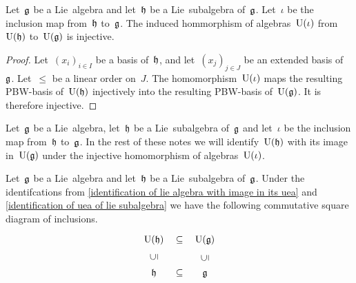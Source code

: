 

\begin{proposition}
	\label{inclusion of universal enveloping algebras}
	Let~$\mathfrak{g}$ be a Lie~algebra and let~$\mathfrak{h}$ be a Lie~subalgebra of~$\mathfrak{g}$.
	Let~$\iota$ be the inclusion map from~$\mathfrak{h}$ to~$\mathfrak{g}$.
	The induced hommorphism of algebras~$\operatorname{U}(\iota)$ from~$\operatorname{U}(\mathfrak{h})$ to~$\operatorname{U}(\mathfrak{g})$ is injective.
\end{proposition}


\begin{proof}
	Let~$(x_i)_{i \in I}$ be a basis of~$\mathfrak{h}$, and let~$(x_j)_{j \in J}$ be an extended basis of~$\mathfrak{g}$.
	Let~$\leq$ be a linear order on~$J$.
	The homomorphism~$\operatorname{U}(\iota)$ maps the resulting PBW-basis of~$\operatorname{U}(\mathfrak{h})$ injectively into the resulting PBW-basis of~$\operatorname{U}(\mathfrak{g})$.
	It is therefore injective.
\end{proof}


\begin{convention}
	\label{identification of uea of lie subalgebra}
	Let~$\mathfrak{g}$ be a Lie~algebra, let~$\mathfrak{h}$ be a Lie~subalgebra of~$\mathfrak{g}$ and let~$\iota$ be the inclusion map from~$\mathfrak{h}$ to~$\mathfrak{g}$.
	In the rest of these notes we will identify~$\operatorname{U}(\mathfrak{h})$ with its image in~$\operatorname{U}(\mathfrak{g})$ under the injective homomorphism of algebras~$\operatorname{U}(\iota)$.
\end{convention}


\begin{remark}
	Let~$\mathfrak{g}$ be a Lie~algebra and let~$\mathfrak{h}$ be a Lie~subalgebra of~$\mathfrak{g}$.
	Under the identifcations from \cref{identification of lie algebra with image in its uea} and \cref{identification of uea of lie subalgebra} we have the following commutative square diagram of inclusions.
	\[
		\begin{tikzcd}
			\Univ(\hlie)
			\arrow[phantom]{r}{\subseteq}
			&
			\Univ(\glie)
			\\
			\hlie
			\arrow[phantom]{u}[rotate=90]{\subseteq}
			\arrow[phantom]{r}{\subseteq}
			&
			\glie
			\arrow[phantom]{u}[rotate=90]{\subseteq}
		\end{tikzcd}
	\]
\end{remark}



